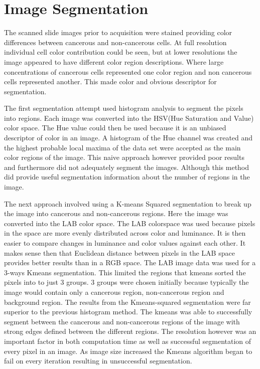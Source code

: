 \documentclass[a4paper,10pt,oneside]{article}
\begin{document}

\section{Image Segmentation}
The scanned slide images prior to acquisition were stained providing color differences between cancerous and non-cancerous cells. At full resolution individual cell color contribution could be seen, but at lower resolutions the image appeared to have different color region descriptions. Where large concentrations of cancerous cells represented one color region and non cancerous cells represented another. This made color and obvious descriptor for segmentation.

The first segmentation attempt used histogram analysis to segment the pixels into regions. Each image was converted into the HSV(Hue Saturation and Value) color space. The Hue value could then be used because it is an unbiased descriptor of color in an image. A histogram of the Hue channel was created and the highest probable local maxima of the data set were accepted as the main color regions of the image. This naive approach however provided poor results and furthermore did not adequately segment the images. Although this method did provide useful segmentation information about the number of regions in the image.

The next approach involved using a K-means Squared segmentation to break up the image into cancerous and non-cancerous regions. Here the image was converted into the LAB color space. The LAB colorspace was used because pixels in the space are more evenly distributed across color and luminance. It is then easier to compare changes in luminance and color values against each other. It makes sense then that Euclidean distance between pixels in the LAB space provides better results than in a RGB space. The LAB image data was used for a 3-ways Kmeans segmentation. This limited the regions that kmeans sorted the pixels into to just 3 groups. 3 groups were chosen initially because typically the image would contain only a cancerous region, non-cancerous region and background region. The results from the Kmeans-squared segmentation were far superior to the previous histogram method. The kmeans was able to successfully segment between the cancerous and non-cancerous regions of the image with strong edges defined between the different regions. The resolution however was an important factor in both computation time as well as successful segmentation of every pixel in an image. As image size increased the Kmeans algorithm began to fail on every iteration resulting in unsuccessful segmentation.
\end{document}
